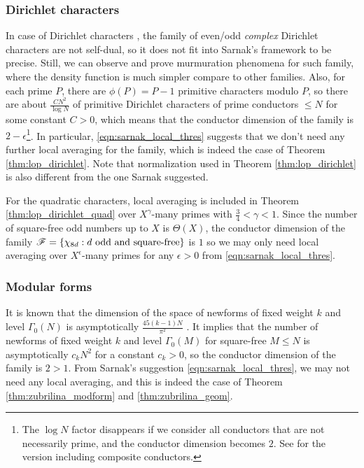 \subsubsection{Dirichlet characters}

In case of Dirichlet characters \cite{lee2025murmurations}, the family of even/odd \emph{complex} Dirichlet characters are not self-dual, so it does not fit into Sarnak's framework to be precise.
Still, we can observe and prove murmuration phenomena for such family, where the density function is much simpler compare to other families.
Also, for each prime $P$, there are $\phi(P) = P-1$ primitive characters modulo $P$, so there are about $\frac{CN^2}{\log N}$ of primitive Dirichlet characters of prime conductors $\le N$ for some constant $C > 0$, which means that the conductor dimension of the family is $2-\epsilon$\footnote{The $\log N$ factor disappears if we consider all conductors that are not necessarily prime, and the conductor dimension becomes $2$. See \cite[Section 6]{lee2025murmurations} for the version including composite conductors.}.
In particular, \eqref{eqn:sarnak_local_thres} suggests that we don't need any further local averaging for the family, which is indeed the case of Theorem \ref{thm:lop_dirichlet}.
Note that normalization used in Theorem \ref{thm:lop_dirichlet} is also different from the one Sarnak suggested.

For the quadratic characters, local averaging is included in Theorem \ref{thm:lop_dirichlet_quad} over $X^{\gamma}$-many primes with $\frac{3}{4} < \gamma < 1$.
Since the number of square-free odd numbers up to $X$ is $\Theta(X)$, the conductor dimension of the family $\mathscr{F} = \{\chi_{8d} : d\text{ odd and square-free}\}$ is $1$ so we may only need local averaging over $X^{\epsilon}$-many primes for any $\epsilon > 0$ from \eqref{eqn:sarnak_local_thres}.

\subsubsection{Modular forms}

It is known that the dimension of the space of newforms of fixed weight $k$ and level $\Gamma_0(N)$ is asymptotically $\frac{45(k-1)N}{\pi^2}$ \cite[Theorem 8]{martin2005dimensions}.
It implies that the number of newforms of fixed weight $k$ and level $\Gamma_0(M)$ for square-free $M \le N$ is asymptotically $c_k N^2$ for a constant $c_k > 0$, so the conductor dimension of the family is $2 > 1$.
From Sarnak's suggestion \eqref{eqn:sarnak_local_thres}, we may not need any local averaging, and this is indeed the case of Theorem \ref{thm:zubrilina_modform} and \ref{thm:zubrilina_geom}.

